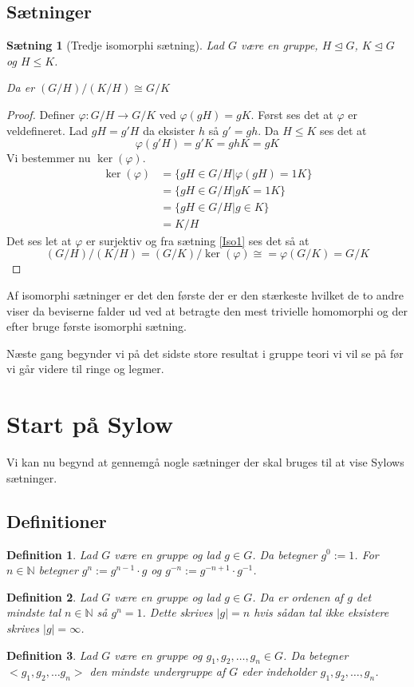 \documentclass{article}
\newcommand{\N}{\mathbb{N}}
\newcommand{\inv}{^{-1}}
\newcommand{\too}{\rightarrow}
\newtheorem{setn}{Sætning}
\newtheorem{defi}{Definition}
\begin{document}
		\subsection*{Sætninger}
		\begin{setn}[Tredje isomorphi sætning] \label{Iso3}
			Lad $G$ være en gruppe, $H \unlhd G$, $K \unlhd G$ og $H \le K$.

			Da er $(G/H)/(K/H) \cong G/K$
		\end{setn}
		\begin{proof}
			Definer $\varphi: G/H \too G/K$ ved $\varphi(gH) = gK$. Først ses
			det at $\varphi$ er veldefineret. Lad $gH = g'H$ da eksister $h$ så
			$g' = gh$. Da $H \le K$ ses det at
			$$\varphi(g'H) = g'K = ghK = gK$$
			Vi bestemmer nu $\ker(\varphi)$.
			\begin{align*}
				\ker(\varphi) &= \{gH \in G/H| \varphi(gH) = 1K\} \\
				&= \{gH \in G/H| gK = 1K\} \\
				&= \{gH \in G/H| g \in K\} \\
				&= K/H
			\end{align*}
			Det ses let at $\varphi$ er surjektiv og fra sætning \ref{Iso1} ses det så at
			$$(G/H)/(K/H) = (G/K)/\ker(\varphi) \cong = \varphi(G/K) = G/K$$
		\end{proof}
		Af isomorphi sætninger er det den første der er den stærkeste hvilket de to andre viser
		da beviserne falder ud ved at betragte den mest trivielle homomorphi og der efter bruge
		første isomorphi sætning.

		Næste gang begynder vi på det sidste store resultat i gruppe teori vi vil se på før vi
		går videre til ringe og legmer.
	\newpage
	\section*{Start på Sylow}
		Vi kan nu begynd at gennemgå nogle sætninger der skal bruges til at vise
		Sylows sætninger.
		\subsection*{Definitioner}
		\begin{defi}
			Lad $G$ være en gruppe og lad $g \in G$.
			Da betegner $g^0 :=1$.
			For $n \in \N$ betegner $g^n := g^{n-1}\cdot g$ og $g^{-n} := g^{-n+1}\cdot g\inv$.
		\end{defi}
		\begin{defi}
			Lad $G$ være en gruppe og lad $g \in G$.
			Da er ordenen af $g$ det mindste tal $n \in \N$ så $g^n = 1$.
			Dette skrives $|g| = n$ hvis sådan tal ikke eksistere skrives $|g| = \infty$.
		\end{defi}
		\begin{defi}
			Lad $G$ være en gruppe og $g_1, g_2, \dots, g_n \in G$. Da betegner
			$<g_1,g_2,\dots g_n>$ den mindste undergruppe af $G$ eder indeholder
			$g_1, g_2, \dots, g_n$.
		\end{defi}
\end{document}
